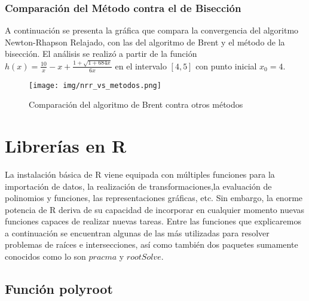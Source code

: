 \documentclass[a4paper,12pt]{article}
\begin{document}
\newpage

\subsubsection{Comparación del Método contra el de Bisección}

A continuación se presenta la gráfica que compara la convergencia del algoritmo Newton-Rhapson Relajado, con las del algoritmo de Brent y el método de la bisección. El análisis se realizó a partir de la función $h(x)=\frac{10}{x}-x +\frac{1 + \sqrt{1 + 684 x}}{6x}$ en el intervalo $[4,5]$ con punto inicial $x_0 = 4$. \par

\vspace{-1em}
\begin{figure}[ht!]
\centering
\texttt{[image: img/nrr\_vs\_metodos.png]}
\vspace{-1em}
\caption{Comparación del algoritmo de Brent contra otros métodos}
\label{fig:nrr_vs_metodos}
\end{figure}

\newpage


\section{Librerías en R}

La instalación básica de R viene equipada con múltiples funciones para la importación de datos, la realización de transformaciones,la evaluación de polinomios y funciones, las representaciones gráficas, etc. Sin embargo, la enorme potencia de R deriva de su capacidad de incorporar en cualquier momento nuevas funciones capaces de realizar nuevas tareas.
Entre las funciones que explicaremos a continuación se encuentran algunas de las más utilizadas para resolver problemas de raíces e intersecciones, así como también dos paquetes sumamente conocidos como lo son $pracma$ y $rootSolve$.
\par


\subsection{Función polyroot}
\end{document}
